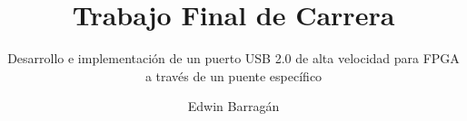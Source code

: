 \author[E. Barragán]{Edwin Barragán}
\newcommand{\asesores}{Mag.~Ing.~Cristian Sisterna\hfill Mgtr.~Ing.~Martín~Perez\hfill Dr.~Ing~Marcelo~Segura\hfill}
\title{Trabajo Final de Carrera}
\newcommand{\carrera}{Ingeniería Electrónica}
\subtitle{Desarrollo e implementación de un puerto USB 2.0 de alta velocidad para
	FPGA a través de un puente específico}
\date{}